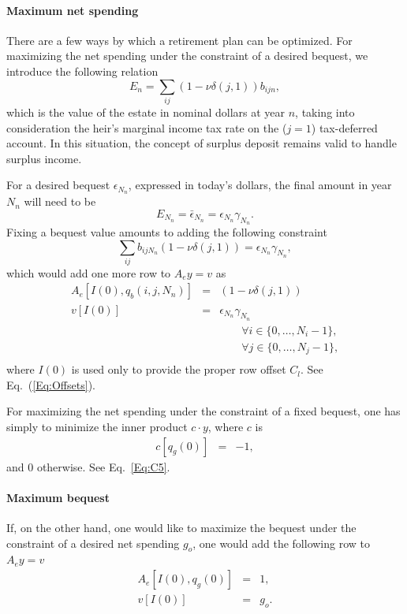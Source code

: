 \documentclass{report}[fleqn,12pt]
\begin{document}
\paragraph*{Maximum net spending}
There are a few ways by which a retirement plan can be optimized. For maximizing the net spending under
the constraint of a desired bequest, we introduce the following relation
\begin{equation}
	\label{Eq:Bequest}
	E_n = \sum_{ij} (1 - \nu\delta(j, 1)) b_{ijn},
\end{equation}
which is the value of the estate in nominal dollars at year $n$,
taking into consideration the heir's marginal income tax rate on the ($j=1$) tax-deferred account. 
In this situation, the concept of surplus deposit remains valid to handle
surplus income.

For a desired bequest $\epsilon_{N_n}$, expressed in today's
dollars, the final amount in year $N_n$ will need to be
\begin{equation}
	E_{N_n} = \bar\epsilon_{N_n} = \epsilon_{N_n} \gamma_{N_n}.
\end{equation}
Fixing a bequest value amounts to adding the following constraint
\begin{equation}
	\sum_{ij} b_{ijN_n} (1 - \nu\delta(j, 1)) = \epsilon_{N_n} \gamma_{N_n},
\end{equation}
which would add one more row to $A_ey = v$ as
\begin{eqnarray}
	A_e[I(0), q_b(i, j, N_n)] &=& (1 - \nu\delta(j, 1)) \nonumber \\
	v[I(0)] &=& \epsilon_{N_n}\gamma_{N_n} \\
	&&\qquad\forall i \in \{0,\ldots, N_i-1\},\nonumber\\
	&&\qquad\forall j \in \{0,\ldots, N_j-1\},\nonumber\\
\end{eqnarray}
where $I(0)$ is used only to provide the proper row offset $C_l$. See Eq.~(\ref{Eq:Offsets}).

For maximizing the net spending under the constraint of a fixed bequest, one has simply to
minimize the inner product $c\cdot y$, where $c$ is
\begin{eqnarray}
	c[q_g(0)] &=& -1,
\end{eqnarray}
and 0 otherwise. See Eq.~\ref{Eq:C5}.

\paragraph*{Maximum bequest}
If, on the other hand, one would like to maximize the bequest under the constraint of a desired net spending $g_o$,
one would add the following row to $A_ey = v$
\begin{eqnarray}
	\label{Eq:FixedIncome}
	A_e[I(0), q_g(0)] &=& 1, \nonumber \\
	v[I(0)] &=& g_o.
\end{eqnarray}
\end{document}
